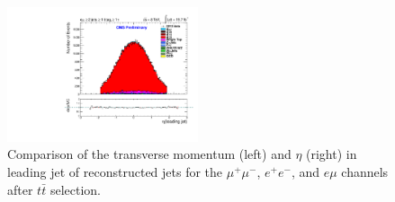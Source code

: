 \documentclass[oneside, a4paper, 11pt, ]{report}
\begin{document}
\begin{figure}
\includegraphics[width=0.5\textwidth]{Plots/ControlPlots/TTbarDiLeptonAnalysis/EMu/Jets/jet1_eta_splitTTbar_ratio.pdf}
\caption{Comparison of the transverse momentum (left) and $\eta$ (right) in leading jet of reconstructed jets for the $\mu^{+}\mu^{-}$, $e^{+}e^{-}$, and $e\mu$ channels after $t\bar{t}$ selection.}
\label{fig-jets}
\end{figure}
\end{document}
